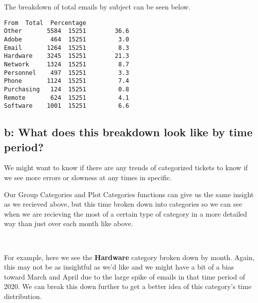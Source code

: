 \documentclass[11pt]{article}
\makeatletter
\newcommand{\boxspacing}{\kern\kvtcb@left@rule\kern\kvtcb@boxsep}
\newcommand{\prompt}[4]{
        \ttfamily\llap{{\color{#2}[#3]:\hspace{3pt}#4}}\vspace{-\baselineskip}
    }
\makeatother
\begin{document}
    The breakdown of total emails by subject can be seen below.

            \begin{tcolorbox}[breakable, size=fbox, boxrule=.5pt, pad at break*=1mm, opacityfill=0]
\prompt{Out}{outcolor}{36}{\boxspacing}
\begin{Verbatim}[commandchars=\\\{\}]
            From  Total  Percentage
Other       5584  15251        36.6
Adobe        464  15251         3.0
Email       1264  15251         8.3
Hardware    3245  15251        21.3
Network     1324  15251         8.7
Personnel    497  15251         3.3
Phone       1124  15251         7.4
Purchasing   124  15251         0.8
Remote       624  15251         4.1
Software    1001  15251         6.6
\end{Verbatim}
\end{tcolorbox}
        
    \hypertarget{b-what-does-this-breakdown-look-like-by-time-period}{%
\subsection{b: What does this breakdown look like by time
period?}\label{b-what-does-this-breakdown-look-like-by-time-period}}

We might want to know if there are any trends of categorized tickets to
know if we see more errors or slowness at any times in specific.

    Our Group Categories and Plot Categories functions can give us the same
insight as we recieved above, but this time broken down into categories
so we can see when we are recieving the most of a certain type of
category in a more detailed way than just over each month like above.


    \begin{center}
    \end{center}
    { \hspace*{\fill} \\}
    
    For example, here we see the \textbf{Hardware} category broken down by
month. Again, this may not be as insightful as we'd like and we might
have a bit of a bias toward March and April due to the large spike of
emails in that time period of 2020. We can break this down further to
get a better idea of this category's time distribution.

    \begin{center}
    \end{center}
    { \hspace*{\fill} \\}
    
\end{document}
